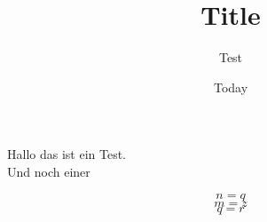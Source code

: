 \documentclass[11pt]{article}
\begin{document}
\title{Title}
\author{Test}
\date{Today}
Hallo das ist ein Test. \\
Und noch einer

\begin{multicols}{3}
\begin{equation}
n = q
\end{equation}
\begin{equation}
m = z
\end{equation}
\begin{equation}
q = r
\end{equation}
\end{multicols}
\end{document}
